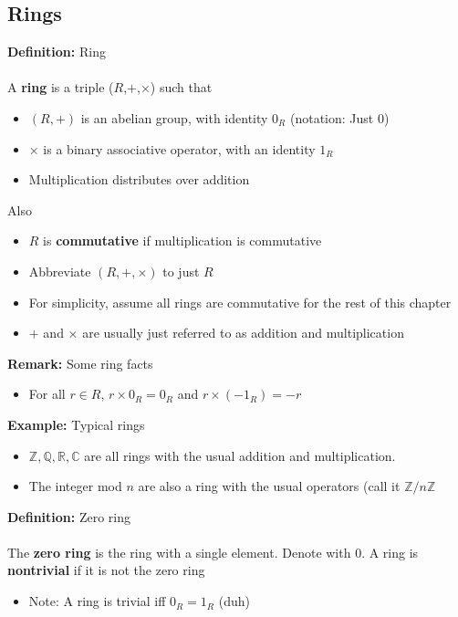 \documentclass{article}
\newcommand{\Z}{\mathbb{Z}}
\newcommand{\R}{\mathbb{R}}
\newcommand{\C}{\mathbb{C}}
\newcommand{\Q}{\mathbb{Q}}
\begin{document}
\subsection{Rings}
\begin{definition} 
\textbf{Definition:} Ring \\
~\\
A {\color{blue} \textbf{ring}} is a triple ($R$,$+$,$\times$) such that
\begin{itemize}
	\item $(R,+)$ is an abelian group, with identity $0_R$ (notation: Just $0$)
	\item $\times$ is a binary associative operator, with an identity $1_R$
	\item Multiplication distributes over addition
\end{itemize}
Also
\begin{itemize}
	\item $R$ is {\color{blue} \textbf{commutative}} if multiplication is commutative
	\item Abbreviate $(R,+,\times)$ to just $R$
	\item For simplicity, assume all rings are commutative for the rest of this chapter
	\item $+$ and $\times$ are usually just referred to as addition and multiplication
\end{itemize}
\end{definition}
\begin{remark} 
\textbf{Remark:} Some ring facts
\begin{itemize}
	\item For all $r \in R$, $r \times 0_R = 0_R$ and $r \times (-1_R) = -r$
\end{itemize}
\end{remark}
\begin{example} 
\textbf{Example:} Typical rings
\begin{itemize}
      \item $\Z, \Q, \R, \C$ are all rings with the usual addition and multiplication.
      \item The integer mod $n$ are also a ring with the usual operators (call it $\Z /n\Z$
\end{itemize}
\end{example}
\begin{definition} 
\textbf{Definition:} Zero ring \\
~\\
The {\color{blue} \textbf{zero ring}} is the ring with a single element. Denote with $0$. A ring is {\color{blue} \textbf{nontrivial}} if it is not the zero ring
\begin{itemize}
	\item Note: A ring is trivial iff $0_R = 1_R$ (duh)
\end{itemize}
\end{definition}
\end{document}

